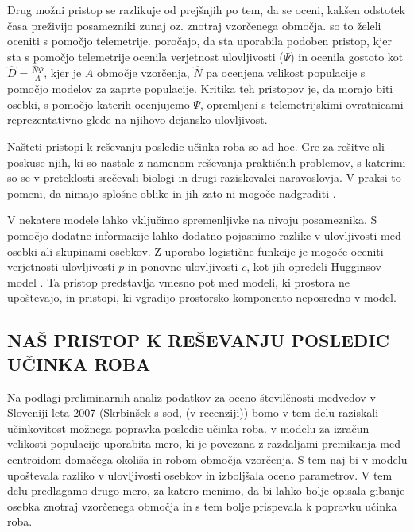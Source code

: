 Drug možni pristop se razlikuje od prejšnjih po tem, da se oceni, kakšen odstotek časa preživijo posamezniki zunaj oz. znotraj vzorčenega območja. \citet{ivan_using_2013} so to želeli oceniti s pomočjo telemetrije. \citet{royle_spatial_2013} poročajo, da sta \citet{white_chapter_2001} uporabila podoben pristop, kjer sta s pomočjo telemetrije ocenila verjetnost ulovljivosti ($\Psi$) in ocenila gostoto kot $\hat{D} = \frac{\hat{N} \Psi}{A}$, kjer je $A$ območje vzorčenja, $\hat{N}$ pa ocenjena velikost populacije s pomočjo modelov za zaprte populacije. Kritika teh pristopov je, da morajo biti osebki, s pomočjo katerih ocenjujemo $\Psi$, opremljeni s telemetrijskimi ovratnicami reprezentativno glede na njihovo dejansko ulovljivost.

Našteti pristopi k reševanju posledic učinka roba so ad hoc. Gre za rešitve ali poskuse njih, ki so nastale z namenom reševanja praktičnih problemov, s katerimi so se v preteklosti srečevali biologi in drugi raziskovalci naravoslovja. V praksi to pomeni, da nimajo splošne oblike in jih zato ni mogoče nadgraditi \citep{royle_spatial_2013}.

V nekatere modele lahko vključimo spremenljivke na nivoju posameznika. S pomočjo dodatne informacije lahko dodatno pojasnimo razlike v ulovljivosti med osebki ali skupinami osebkov. Z uporabo logistične funkcije je mogoče oceniti verjetnosti ulovljivosti $p$ in ponovne ulovljivosti $c$, kot jih opredeli Hugginsov model \citep{boulanger_corrigendum_2001, boulanger_sources_2004}. Ta pristop predstavlja vmesno pot med modeli, ki prostora ne upoštevajo, in pristopi, ki vgradijo prostorsko komponento neposredno v model.

\subsection{NAŠ PRISTOP K REŠEVANJU POSLEDIC UČINKA ROBA}
Na podlagi preliminarnih analiz podatkov za oceno številčnosti medvedov v Sloveniji leta 2007 (Skrbinšek s sod, (v recenziji)) bomo v tem delu raziskali učinkovitost možnega popravka posledic učinka roba. \citet{boulanger_corrigendum_2001} v modelu za izračun velikosti populacije uporabita mero, ki je povezana z razdaljami premikanja med centroidom domačega okoliša in robom območja vzorčenja. S tem naj bi v modelu upoštevala razliko v ulovljivosti osebkov in izboljšala oceno parametrov. V tem delu predlagamo drugo mero, za katero menimo, da bi lahko bolje opisala gibanje osebka znotraj vzorčenega območja in s tem bolje prispevala k popravku učinka roba.

